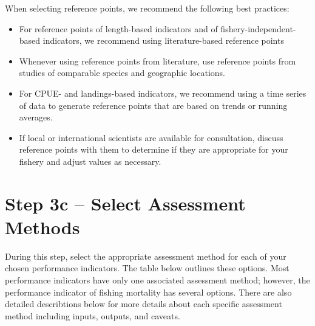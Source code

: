 \documentclass[]{book}
\begin{document}
When selecting reference points, we recommend the following best
practices:

\begin{itemize}
\item
  For reference points of length-based indicators and of
  fishery-independent-based indicators, we recommend using
  literature-based reference points
\item
  Whenever using reference points from literature, use reference points
  from studies of comparable species and geographic locations.
\item
  For CPUE- and landings-based indicators, we recommend using a time
  series of data to generate reference points that are based on trends
  or running averages.
\item
  If local or international scientists are available for consultation,
  discuss reference points with them to determine if they are
  appropriate for your fishery and adjust values as necessary.
\end{itemize}

\section{Step 3c -- Select Assessment Methods}\label{Step3c}

During this step, select the appropriate assessment method for each of
your chosen performance indicators. The table below outlines these
options. Most performance indicators have only one associated assessment
method; however, the performance indicator of fishing mortality has
several options. There are also detailed describtions below for more
details about each specific assessment method including inputs, outputs,
and caveats.
\end{document}
